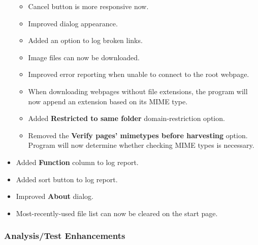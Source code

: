 \documentclass[
]{book}
\providecommand{\tightlist}{%
  \setlength{\itemsep}{0pt}\setlength{\parskip}{0pt}}
\theoremstyle{definition}
\theoremstyle{definition}
\theoremstyle{definition}
\theoremstyle{definition}
\theoremstyle{remark}
\begin{document}
\begin{itemize}
  \begin{itemize}
  \tightlist
  \item
    Cancel button is more responsive now.
  \item
    Improved dialog appearance.
  \item
    Added an option to log broken links.
  \item
    Image files can now be downloaded.
  \item
    Improved error reporting when unable to connect to the root webpage.
  \item
    When downloading webpages without file extensions, the program will now append an extension based on its MIME type.
  \item
    Added \textbf{Restricted to same folder} domain-restriction option.
  \item
    Removed the \textbf{Verify pages' mimetypes before harvesting} option. Program will now determine whether checking MIME types is necessary.
  \end{itemize}
\item
  Added \textbf{Function} column to log report.
\item
  Added sort button to log report.
\item
  Improved \textbf{About} dialog.
\item
  Most-recently-used file list can now be cleared on the start page.
\end{itemize}

\hypertarget{analysistest-enhancements}{%
\subsubsection*{Analysis/Test Enhancements}\label{analysistest-enhancements}}
\end{document}
